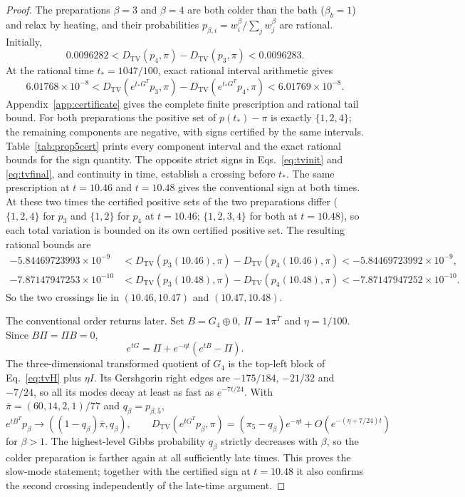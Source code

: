 \documentclass[11pt,a4paper]{article}
\theoremstyle{remark}\newtheorem{remark}[theorem]{Remark}
\newcommand{\one}{\mathbf 1}
\newcommand{\TV}{D_{\mathrm{TV}}}
\begin{document}
\begin{proof}
The preparations $\beta=3$ and $\beta=4$ are both colder than the bath ($\beta_b=1$) and relax by heating, and their probabilities $p_{\beta,i}=w_i^\beta/\sum_j w_j^\beta$ are rational. Initially,
\begin{equation}
 0.0096282<\TV(p_4,\pi)-\TV(p_3,\pi)<0.0096283.
 \label{eq:tvinit}
\end{equation}
At the rational time $t_*=1047/100$, exact rational interval arithmetic gives
\begin{equation}
 6.01768\times10^{-8}
 <\TV(e^{t_*G^T}p_3,\pi)-\TV(e^{t_*G^T}p_4,\pi)
 <6.01769\times10^{-8}.
 \label{eq:tvfinal}
\end{equation}
Appendix~\ref{app:certificate} gives the complete finite prescription and rational tail bound. For both preparations the positive set of $p(t_*)-\pi$ is exactly $\{1,2,4\}$; the remaining components are negative, with signs certified by the same intervals. Table~\ref{tab:prop5cert} prints every component interval and the exact rational bounds for the sign quantity. The opposite strict signs in Eqs.~\eqref{eq:tvinit} and \eqref{eq:tvfinal}, and continuity in time, establish a crossing before $t_*$. The same prescription at $t=10.46$ and $t=10.48$ gives the conventional sign at both times. At these two times the certified positive sets of the two preparations differ ($\{1,2,4\}$ for $p_3$ and $\{1,2\}$ for $p_4$ at $t=10.46$; $\{1,2,3,4\}$ for both at $t=10.48$), so each total variation is bounded on its own certified positive set. The resulting rational bounds are
\begin{equation}
\begin{aligned}
 -5.84469723993\times10^{-9}&<\TV(p_3(10.46),\pi)-\TV(p_4(10.46),\pi)<-5.84469723992\times10^{-9},\\
 -7.87147947253\times10^{-10}&<\TV(p_3(10.48),\pi)-\TV(p_4(10.48),\pi)<-7.87147947252\times10^{-10}.
\end{aligned}
\label{eq:tvbrackets}
\end{equation}
So the two crossings lie in $(10.46,10.47)$ and $(10.47,10.48)$.

The conventional order returns later. Set $B=G_4\oplus0$, $\Pi=\one\pi^T$ and $\eta=1/100$. Since $B\Pi=\Pi B=0$,
\begin{equation}
 e^{tG}=\Pi+e^{-\eta t}(e^{tB}-\Pi).
 \label{eq:resetidentity}
\end{equation}
The three-dimensional transformed quotient of $G_4$ is the top-left block of Eq.~\eqref{eq:tvH} plus $\eta I$. Its Gershgorin right edges are $-175/184$, $-21/32$ and $-7/24$, so all its modes decay at least as fast as $e^{-7t/24}$. With $\bar\pi=(60,14,2,1)/77$ and $q_\beta=p_{\beta,5}$,
\begin{equation}
 e^{tB^T}p_\beta\longrightarrow ((1-q_\beta)\bar\pi,q_\beta),
 \qquad
 \TV(e^{tG^T}p_\beta,\pi)
 =(\pi_5-q_\beta)e^{-\eta t}+O(e^{-(\eta+7/24)t})
 \label{eq:tvlate}
\end{equation}
for $\beta>1$. The highest-level Gibbs probability $q_\beta$ strictly decreases with $\beta$, so the colder preparation is farther again at all sufficiently late times. This proves the slow-mode statement; together with the certified sign at $t=10.48$ it also confirms the second crossing independently of the late-time argument.
\end{proof}
\end{document}

